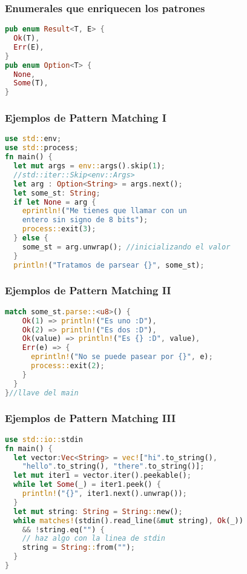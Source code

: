 \documentclass{beamer}
\begin{document}
\begin{frame}[fragile]
  \frametitle{Enumerales que enriquecen los patrones}
  \begin{lstlisting}[language=Rust, style=boxed ]
pub enum Result<T, E> {
  Ok(T),
  Err(E),
}
pub enum Option<T> {
  None,
  Some(T),
}\end{lstlisting}
\end{frame}

\begin{frame}[fragile]
  \frametitle{Ejemplos de Pattern Matching I}
  \begin{lstlisting}[language=Rust, style=boxed ]
use std::env;
use std::process;
fn main() {
  let mut args = env::args().skip(1);
  //std::iter::Skip<env::Args>
  let arg : Option<String> = args.next();
  let some_st: String;
  if let None = arg {
    eprintln!("Me tienes que llamar con un 
    entero sin signo de 8 bits");
    process::exit(3);
  } else {
    some_st = arg.unwrap(); //inicializando el valor
  }
  println!("Tratamos de parsear {}", some_st);\end{lstlisting}

\end{frame}

\begin{frame}[fragile]
  \frametitle{Ejemplos de Pattern Matching II}
  \begin{lstlisting}[language=Rust, style=boxed ]
  match some_st.parse::<u8>() {
    Ok(1) => println!("Es uno :D"),
    Ok(2) => println!("Es dos :D"),
    Ok(value) => println!("Es {} :D", value),
    Err(e) => {
      eprintln!("No se puede pasear por {}", e);
      process::exit(2);
    }
  }
}//llave del main\end{lstlisting}
\end{frame}

\begin{frame}[fragile]
  \frametitle{Ejemplos de Pattern Matching III}
  \begin{lstlisting}[language=Rust, style=boxed ]
use std::io::stdin
fn main() {
  let vector:Vec<String> = vec!["hi".to_string(),
    "hello".to_string(), "there".to_string()];
  let mut iter1 = vector.iter().peekable();
  while let Some(_) = iter1.peek() {
    println!("{}", iter1.next().unwrap());
  }
  let mut string: String = String::new();
  while matches!(stdin().read_line(&mut string), Ok(_))
    && !string.eq("") { 
    // haz algo con la linea de stdin
    string = String::from("");
  }
}\end{lstlisting}
\end{frame}
\end{document}
